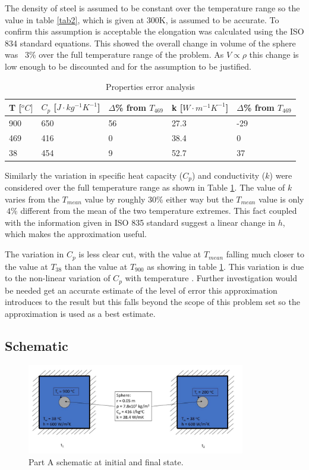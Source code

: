 \documentclass[11pt]{article}
\begin{document}
The density of steel is assumed to be constant over the temperature range so the value in table \ref{tab2}, which is given at 300K, is assumed to be accurate. To confirm this assumption is acceptable the elongation was calculated using the ISO 834 standard equations\cite{jean-marc_franssen_fire_2015}. This showed the overall change in volume of the sphere was ~3\% over the full temperature range of the problem. As $V \propto \rho$ this change is low enough to be discounted and for the assumption to be justified.

\begin{table}[h]
	\centering
	\caption{Properties error analysis}
	\begin{tabular}{lllll}
		T [$^{o}C]$ & $C_{p}$ [$J \cdot kg^{-1}K^{-1}$] & $\Delta$\% from $T_{469}$ & k [$W \cdot m^{-1}K^{-1}$] & $\Delta$\% from $T_{469}$ \\ \hline
		900 & 650 & 56 & 27.3 & -29 \\
		469 & 416 & 0 & 38.4 & 0 \\
		38 & 454 & 9 & 52.7 & 37
	\end{tabular}
	\label{tab3}
\end{table}

Similarly the variation in specific heat capacity ($C_p$) and conductivity ($k$) were considered over the full temperature range as shown in Table \ref{tab3}. The value of $k$ varies from the $T_{mean}$ value by roughly 30\% either way but the $T_{mean}$ value is only $~4\%$ different from the mean of the two temperature extremes. This fact coupled with the information given in ISO 835 standard \cite{jean-marc_franssen_fire_2015} suggest a linear change in $h$, which makes the approximation useful. 

The variation in $C_p$ is less clear cut, with the value at $T_{mean}$ falling much closer to the value at $T_{38}$ than the value at $T_{900}$ as showing in table \ref{tab3}. This variation is due to the non-linear variation of $C_p$ with temperature \cite{jean-marc_franssen_fire_2015}. Further investigation would be needed get an accurate estimate of the level of error this approximation introduces to the result but this falls beyond the scope of this problem set so the approximation is used as a best estimate.
\pagebreak
\subsection{Schematic}
\begin{figure}[!htbp]
	\centering
	\includegraphics[width=0.85\textwidth]{part_a_fig}
	\caption{Part A schematic at initial and final state.}
	\label{fig:schem_a}
\end{figure}
\FloatBarrier
\end{document}
